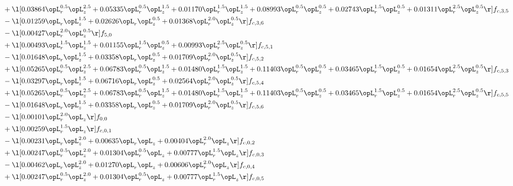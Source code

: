 \begin{alignat}{2}
& + \l[  0.03864 \opL_r^{0.5} \opL_z^{2.5} +  0.05335 \opL_r^{0.5} \opL_z^{1.5} +  0.01170 \opL_r^{1.5} \opL_z^{1.5} +  0.08993 \opL_r^{0.5} \opL_z^{0.5} +  0.02743 \opL_r^{1.5} \opL_z^{0.5} +  0.01311 \opL_r^{2.5} \opL_z^{0.5}  \r] f_{c,3,5} \nonumber \\ 
& - \l[  0.01259 \opL_r \opL_z^{1.5} +  0.02626 \opL_r \opL_z^{0.5} +  0.01368 \opL_r^{2.0} \opL_z^{0.5}  \r] f_{c,3,6} \nonumber \\ 
& - \l[  0.00427 \opL_r^{2.0} \opL_z^{0.5}  \r] f_{5,0} \nonumber \\ 
& + \l[  0.00493 \opL_r^{1.5} \opL_z^{1.5} +  0.01155 \opL_r^{1.5} \opL_z^{0.5} +  0.00993 \opL_r^{2.5} \opL_z^{0.5}  \r] f_{c,5,1} \nonumber \\ 
& - \l[  0.01648 \opL_r \opL_z^{1.5} +  0.03358 \opL_r \opL_z^{0.5} +  0.01709 \opL_r^{2.0} \opL_z^{0.5}  \r] f_{c,5,2} \nonumber \\ 
& + \l[  0.05265 \opL_r^{0.5} \opL_z^{2.5} +  0.06783 \opL_r^{0.5} \opL_z^{1.5} +  0.01480 \opL_r^{1.5} \opL_z^{1.5} +  0.11403 \opL_r^{0.5} \opL_z^{0.5} +  0.03465 \opL_r^{1.5} \opL_z^{0.5} +  0.01654 \opL_r^{2.5} \opL_z^{0.5}  \r] f_{c,5,3} \nonumber \\ 
& - \l[  0.03297 \opL_r \opL_z^{1.5} +  0.06716 \opL_r \opL_z^{0.5} +  0.02564 \opL_r^{2.0} \opL_z^{0.5}  \r] f_{c,5,4} \nonumber \\ 
& + \l[  0.05265 \opL_r^{0.5} \opL_z^{2.5} +  0.06783 \opL_r^{0.5} \opL_z^{1.5} +  0.01480 \opL_r^{1.5} \opL_z^{1.5} +  0.11403 \opL_r^{0.5} \opL_z^{0.5} +  0.03465 \opL_r^{1.5} \opL_z^{0.5} +  0.01654 \opL_r^{2.5} \opL_z^{0.5}  \r] f_{c,5,5} \nonumber \\ 
& - \l[  0.01648 \opL_r \opL_z^{1.5} +  0.03358 \opL_r \opL_z^{0.5} +  0.01709 \opL_r^{2.0} \opL_z^{0.5}  \r] f_{c,5,6} \nonumber \\ 
& - \l[  0.00101 \opL_r^{2.0} \opL_z  \r] f_{0,0} \nonumber \\ 
& + \l[  0.00259 \opL_r^{1.5} \opL_z  \r] f_{c,0,1} \nonumber \\ 
& - \l[  0.00231 \opL_r \opL_z^{2.0} +  0.00635 \opL_r \opL_z +  0.00404 \opL_r^{2.0} \opL_z  \r] f_{c,0,2} \nonumber \\ 
& + \l[  0.00247 \opL_r^{0.5} \opL_z^{2.0} +  0.01304 \opL_r^{0.5} \opL_z +  0.00777 \opL_r^{1.5} \opL_z  \r] f_{c,0,3} \nonumber \\ 
& - \l[  0.00462 \opL_r \opL_z^{2.0} +  0.01270 \opL_r \opL_z +  0.00606 \opL_r^{2.0} \opL_z  \r] f_{c,0,4} \nonumber \\ 
& + \l[  0.00247 \opL_r^{0.5} \opL_z^{2.0} +  0.01304 \opL_r^{0.5} \opL_z +  0.00777 \opL_r^{1.5} \opL_z  \r] f_{c,0,5} \nonumber \\ 

\end{alignat}
